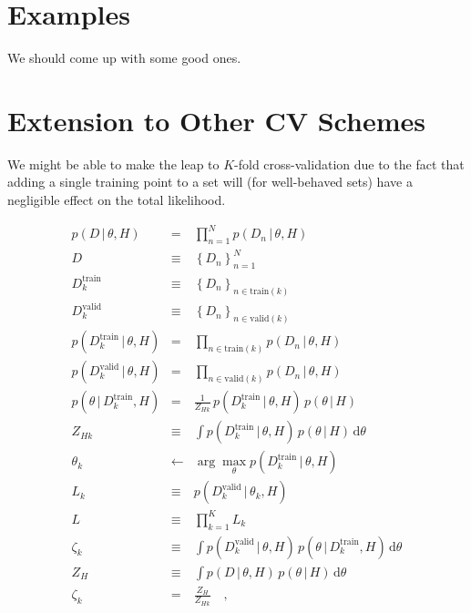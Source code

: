 \documentclass[12pt,pdftex]{article}
\newcommand{\given}{\,|\,}
\newcommand{\setof}[1]{\left\{{#1}\right\}}
\newcommand{\train}{\mathrm{train}}
\newcommand{\valid}{\mathrm{valid}}
\newcommand{\dd}{\mathrm{d}}
\begin{document}
\section{Examples}
We should come up with some good ones.

\section{Extension to Other CV Schemes}

We might be able to make the leap to $K$-fold cross-validation due to the fact
that adding a single training point to a set will (for well-behaved sets)
have a negligible effect on the total likelihood.

\begin{eqnarray}
p(D\given\theta,H) &=& \prod_{n=1}^N p(D_n\given\theta,H)
\\
D &\equiv& \setof{D_n}_{n=1}^N
\\
D^\train_k &\equiv& \setof{D_n}_{n\in\train(k)}
\\
D^\valid_k &\equiv& \setof{D_n}_{n\in\valid(k)}
\\
p(D^\train_k\given\theta,H) &=& \prod_{n\in\train(k)} p(D_n\given\theta,H)
\\
p(D^\valid_k\given\theta,H) &=& \prod_{n\in\valid(k)} p(D_n\given\theta,H)
\\
p(\theta\given D^\train_k,H) &=& \frac{1}{Z_{Hk}}\,p(D^\train_k\given\theta,H)\,p(\theta\given H)
\\
Z_{Hk} &\equiv& \int p(D^\train_k\given\theta,H)\,p(\theta\given H)\,\dd\theta
\\
\theta_k &\leftarrow& \arg\max_\theta p(D^\train_k\given\theta,H)
\\
L_k &\equiv& p(D^\valid_k\given\theta_k,H)
\\
L &\equiv& \prod_{k=1}^K L_k
\\
\zeta_k &\equiv& \int p(D^\valid_k\given\theta,H)\,p(\theta\given D^\train_k,H)\,\dd\theta
\\
Z_H &\equiv& \int p(D\given\theta,H)\,p(\theta\given H)\,\dd\theta
\\
\zeta_k &=& \frac{Z_H}{Z_{Hk}}
\quad,
\end{eqnarray}
\end{document}
